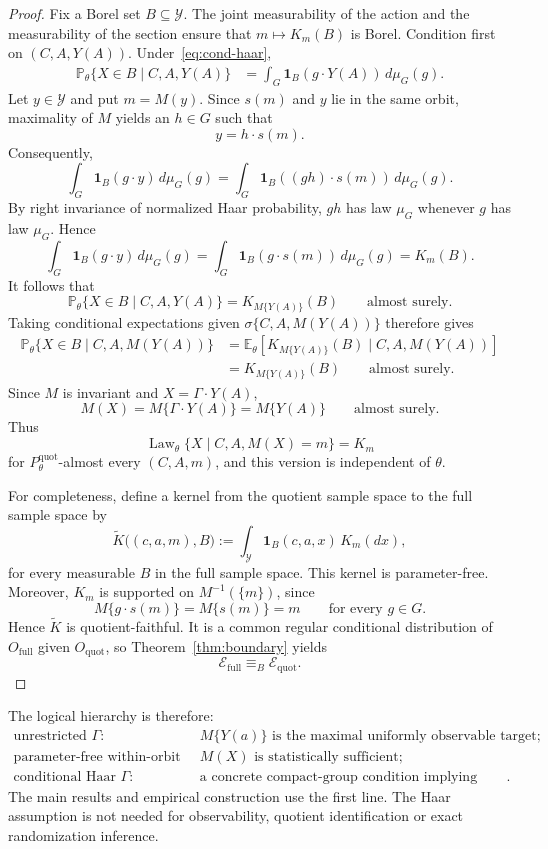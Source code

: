 \documentclass[11pt]{article}
\theoremstyle{plain}
\theoremstyle{definition}
\numberwithin{equation}{section}
\DeclareMathOperator{\Law}{Law}
\newcommand{\Prob}{\mathbb P}
\newcommand{\1}{\mathbf 1}
\newcommand{\calE}{\mathcal E}
\newcommand{\calY}{\mathcal Y}
\newcommand{\full}{\mathrm{full}}
\newcommand{\quot}{\mathrm{quot}}
\begin{document}
\begin{proof}
	Fix a Borel set \(B\subseteq\calY\). The joint measurability of the action and
	the measurability of the section ensure that \(m\mapsto K_m(B)\) is Borel.
	Condition first on \((C,A,Y(A))\). Under~\eqref{eq:cond-haar},
	\[
	\begin{aligned}
		\Prob_\theta\{X\in B\mid C,A,Y(A)\}
		&=
		\int_G
		\mathbf 1_B\!\left(g\cdot Y(A)\right)\,d\mu_G(g).
	\end{aligned}
	\]
	Let \(y\in\calY\) and put \(m=M(y)\). Since \(s(m)\) and \(y\) lie in the same
	orbit, maximality of \(M\) yields an \(h\in G\) such that
	\[
	y=h\cdot s(m).
	\]
	Consequently,
	\[
	\int_G\mathbf 1_B(g\cdot y)\,d\mu_G(g)
	=
	\int_G\mathbf 1_B\!\left((gh)\cdot s(m)\right)\,d\mu_G(g).
	\]
	By right invariance of normalized Haar probability, \(gh\) has law \(\mu_G\)
	whenever \(g\) has law \(\mu_G\). Hence
	\[
	\int_G\mathbf 1_B(g\cdot y)\,d\mu_G(g)
	=
	\int_G\mathbf 1_B\!\left(g\cdot s(m)\right)\,d\mu_G(g)
	=
	K_m(B).
	\]
	It follows that
	\[
	\Prob_\theta\{X\in B\mid C,A,Y(A)\}
	=
	K_{M\{Y(A)\}}(B)
	\qquad\text{almost surely}.
	\]
	Taking conditional expectations given
	\(\sigma\{C,A,M(Y(A))\}\) therefore gives
	\[
	\begin{aligned}
		\Prob_\theta\{X\in B\mid C,A,M(Y(A))\}
		&=
		\mathbb E_\theta\!\left[
		K_{M\{Y(A)\}}(B)
		\mid C,A,M(Y(A))
		\right]\\
		&=
		K_{M\{Y(A)\}}(B)
		\qquad\text{almost surely}.
	\end{aligned}
	\]
	Since \(M\) is invariant and \(X=\Gamma\cdot Y(A)\),
	\[
	M(X)=M\{\Gamma\cdot Y(A)\}=M\{Y(A)\}
	\qquad\text{almost surely}.
	\]
	Thus
	\[
	\Law_\theta\{X\mid C,A,M(X)=m\}=K_m
	\]
	for \(P_\theta^{\quot}\)-almost every \((C,A,m)\), and this version is
	independent of \(\theta\).
	
	For completeness, define a kernel from the quotient sample space to the full
	sample space by
	\[
	\widetilde K\bigl((c,a,m),B\bigr)
	:=
	\int_{\calY}
	\mathbf 1_B(c,a,x)\,K_m(dx),
	\]
	for every measurable \(B\) in the full sample space. This kernel is
	parameter-free. Moreover, \(K_m\) is supported on
	\(M^{-1}(\{m\})\), since
	\[
	M\{g\cdot s(m)\}=M\{s(m)\}=m
	\qquad\text{for every }g\in G.
	\]
	Hence \(\widetilde K\) is quotient-faithful. It is a common regular
	conditional distribution of \(O_{\full}\) given \(O_{\quot}\), so
	Theorem~\ref{thm:boundary} yields
	\[
	\calE_{\full}\equiv_B\calE_{\quot}.
	\]
\end{proof}


The logical hierarchy is therefore:
\[
\begin{array}{ll}
\text{unrestricted }\Gamma: & M\{Y(a)\}\text{ is the maximal uniformly observable target};\\
\text{parameter-free within-orbit law:} & M(X)\text{ is statistically sufficient};\\
\text{conditional Haar }\Gamma: & \text{a concrete compact-group condition implying sufficiency}.
\end{array}
\]
The main results and empirical construction use the first line. The Haar assumption is not needed for observability, quotient identification or exact randomization inference.
\end{document}
